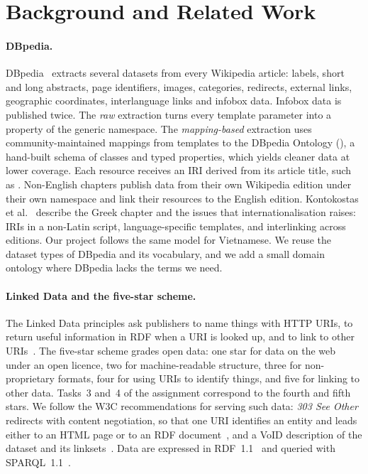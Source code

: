 \section{Background and Related Work}
\label{sec:related}

\paragraph{DBpedia.} DBpedia~\cite{auer2007dbpedia, lehmann2015dbpedia}
extracts several datasets from every Wikipedia article: labels, short and long
abstracts, page identifiers, images, categories, redirects, external links,
geographic coordinates, interlanguage links and infobox data. Infobox data is
published twice. The \emph{raw} extraction turns every template parameter
into a property of the generic  namespace. The \emph{mapping-based}
extraction uses community-maintained mappings from templates to the DBpedia
Ontology (), a hand-built schema of classes and typed properties,
which yields cleaner data at lower coverage. Each resource receives an IRI
derived from its article title, such as
. Non-English chapters publish data
from their own Wikipedia edition under their own namespace and link their
resources to the English edition. Kontokostas et al.~\cite{kontokostas2012greek}
describe the Greek chapter and the issues that internationalisation raises:
IRIs in a non-Latin script, language-specific templates, and interlinking
across editions. Our project follows the same model for Vietnamese. We reuse
the dataset types of DBpedia and its  vocabulary, and we add a small
domain ontology where DBpedia lacks the terms we need.

\paragraph{Linked Data and the five-star scheme.} The Linked Data principles
ask publishers to name things with HTTP URIs, to return useful information in
RDF when a URI is looked up, and to link to other
URIs~\cite{bernerslee2006linked, heath2011linked}. The five-star scheme grades
open data: one star for data on the web under an open licence, two for
machine-readable structure, three for non-proprietary formats, four for using
URIs to identify things, and five for linking to other data. Tasks~3 and~4 of
the assignment correspond to the fourth and fifth stars. We follow the W3C
recommendations for serving such data: \emph{303 See Other} redirects with
content negotiation, so that one URI identifies an entity and leads either to
an HTML page or to an RDF document~\cite{sauermann2008cooluris,
hyland2014bestpractices}, and a VoID description of the dataset and its
linksets~\cite{alexander2011void}. Data are expressed in RDF~1.1~\cite{cyganiak2014rdf}
and queried with SPARQL~1.1~\cite{harris2013sparql}.

